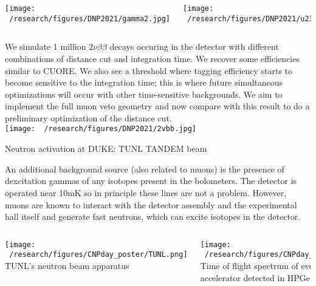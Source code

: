 \documentclass[final]{beamer}
\newlength{\colwidth}
\begin{document}
\begin{frame}[t]
\begin{columns}[t]
\begin{column}{\colwidth}
\begin{columns}[c]
        \column{.5\colwidth} %
        \texttt{[image: ~/research/figures/DNP2021/gamma2.jpg]}
        
        \column{.5\colwidth} %
        \texttt{[image: ~/research/figures/DNP2021/u238.jpg]}
      
      \end{columns}
      \vspace{1cm}

    We simulate 1 million $2\nu\beta\beta$ decays occuring in the detector with different combinations of distance cut and integration time. We recover some efficiencies similar to CUORE. We also see a threshold where tagging efficiency starts to become sensitive to the integration time; this is where future simultaneous optimizations will occur with other time-sensitive backgrounds. We aim to implement the full muon veto geometry and now compare with this result to do a preliminary optimization of the distance cut.
    \\
    \texttt{[image: ~/research/figures/DNP2021/2vbb.jpg]}
  
  \begin{block}{Neutron activation at DUKE: TUNL TANDEM beam}

  \vspace{1cm}
  An additional background source (also related to muons) is the presence of dexcitation gammas of any isotopes present in the bolometers. The detector is operated near 10mK so in principle these lines are not a problem. However, muons are known to interact with the detector assembly and the experimental hall itself and generate fast neutrons, which can excite isotopes in the detector. 


  \begin{columns}[c] %
      
      \column{.5\colwidth} %
      \texttt{[image: ~/research/figures/CNPday\_poster/TUNL.png]}
      {\footnotesize TUNL's neutron beam apparatus}    
      
      \column{.5\colwidth} %
      \texttt{[image: ~/research/figures/CNPday\_poster/8MeV\_TOF.png]}
      {\footnotesize Time of flight spectrum of events from TANDEM accelerator detected in HPGe} 
  \end{columns}


\end{block}
\end{column}
\end{columns}
\end{frame}
\end{document}
